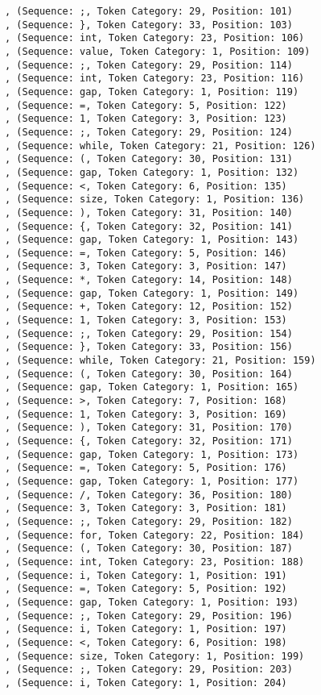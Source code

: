 \documentclass[a4paper, 12pt, article]{memoir}
\begin{document}
\begin{lstlisting}
, (Sequence: ;, Token Category: 29, Position: 101)
, (Sequence: }, Token Category: 33, Position: 103)
, (Sequence: int, Token Category: 23, Position: 106)
, (Sequence: value, Token Category: 1, Position: 109)
, (Sequence: ;, Token Category: 29, Position: 114)
, (Sequence: int, Token Category: 23, Position: 116)
, (Sequence: gap, Token Category: 1, Position: 119)
, (Sequence: =, Token Category: 5, Position: 122)
, (Sequence: 1, Token Category: 3, Position: 123)
, (Sequence: ;, Token Category: 29, Position: 124)
, (Sequence: while, Token Category: 21, Position: 126)
, (Sequence: (, Token Category: 30, Position: 131)
, (Sequence: gap, Token Category: 1, Position: 132)
, (Sequence: <, Token Category: 6, Position: 135)
, (Sequence: size, Token Category: 1, Position: 136)
, (Sequence: ), Token Category: 31, Position: 140)
, (Sequence: {, Token Category: 32, Position: 141)
, (Sequence: gap, Token Category: 1, Position: 143)
, (Sequence: =, Token Category: 5, Position: 146)
, (Sequence: 3, Token Category: 3, Position: 147)
, (Sequence: *, Token Category: 14, Position: 148)
, (Sequence: gap, Token Category: 1, Position: 149)
, (Sequence: +, Token Category: 12, Position: 152)
, (Sequence: 1, Token Category: 3, Position: 153)
, (Sequence: ;, Token Category: 29, Position: 154)
, (Sequence: }, Token Category: 33, Position: 156)
, (Sequence: while, Token Category: 21, Position: 159)
, (Sequence: (, Token Category: 30, Position: 164)
, (Sequence: gap, Token Category: 1, Position: 165)
, (Sequence: >, Token Category: 7, Position: 168)
, (Sequence: 1, Token Category: 3, Position: 169)
, (Sequence: ), Token Category: 31, Position: 170)
, (Sequence: {, Token Category: 32, Position: 171)
, (Sequence: gap, Token Category: 1, Position: 173)
, (Sequence: =, Token Category: 5, Position: 176)
, (Sequence: gap, Token Category: 1, Position: 177)
, (Sequence: /, Token Category: 36, Position: 180)
, (Sequence: 3, Token Category: 3, Position: 181)
, (Sequence: ;, Token Category: 29, Position: 182)
, (Sequence: for, Token Category: 22, Position: 184)
, (Sequence: (, Token Category: 30, Position: 187)
, (Sequence: int, Token Category: 23, Position: 188)
, (Sequence: i, Token Category: 1, Position: 191)
, (Sequence: =, Token Category: 5, Position: 192)
, (Sequence: gap, Token Category: 1, Position: 193)
, (Sequence: ;, Token Category: 29, Position: 196)
, (Sequence: i, Token Category: 1, Position: 197)
, (Sequence: <, Token Category: 6, Position: 198)
, (Sequence: size, Token Category: 1, Position: 199)
, (Sequence: ;, Token Category: 29, Position: 203)
, (Sequence: i, Token Category: 1, Position: 204)

\end{lstlisting}
\end{document}
